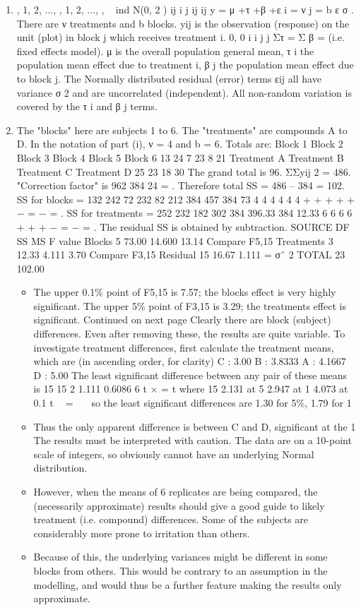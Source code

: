 \documentclass[a4paper,12pt]{article}
\begin{document}
\begin{enumerate}
\item , 1, 2, ..., , 1, 2, ..., , { } ~ ind N(0, 2 ) ij i j ij ij y = μ +τ +β +ε i = ν j = b ε σ .
There are ν treatments and b blocks. yij is the observation (response) on the unit (plot)
in block j which receives treatment i. 0, 0 i i j j Στ = Σ β = (i.e. fixed effects model).
μ is the overall population general mean, τ
i the population mean effect due to
treatment i, β
j the population mean effect due to block j. The Normally distributed
residual (error) terms εij all have variance σ 2 and are uncorrelated (independent). All
non-random variation is covered by the τ
i and β
j terms.
\item The "blocks" here are subjects 1 to 6. The "treatments" are compounds A to
D. In the notation of part (i), ν = 4 and b = 6.
Totals are: Block 1 Block 2 Block 3 Block 4 Block 5 Block 6
13 24 7 23 8 21
Treatment A Treatment B Treatment C Treatment D
25 23 18 30
The grand total is 96. ΣΣyij
2 = 486.
"Correction factor" is
962 384
24
= .
Therefore total SS = 486 – 384 = 102.
SS for blocks =
132 242 72 232 82 212 384 457 384 73
4 4 4 4 4 4
+ + + + + − = − = .
SS for treatments =
252 232 182 302 384 396.33 384 12.33
6 6 6 6
+ + + − = − = .
The residual SS is obtained by subtraction.
SOURCE DF SS MS F value
Blocks 5 73.00 14.600 13.14 Compare F5,15
Treatments 3 12.33 4.111 3.70 Compare F3,15
Residual 15 16.67 1.111 = σˆ 2
TOTAL 23 102.00

\begin{itemize}
    \item 
The upper 0.1\% point of F5,15 is 7.57; the blocks effect is very highly significant.
The upper 5\% point of F3,15 is 3.29; the treatments effect is significant.
Continued on next page
Clearly there are block (subject) differences. Even after removing these, the results
are quite variable.
To investigate treatment differences, first calculate the treatment means, which are (in
ascending order, for clarity)
C : 3.00 B : 3.8333 A : 4.1667 D : 5.00
The least significant difference between any pair of these means is
15 15
2 1.111 0.6086
6
t × = t where 15
2.131 at 5%
2.947 at 1%
4.073 at 0.1%
t

=


so the least significant differences are 1.30 for 5\%, 1.79 for 1%
\item Thus the only apparent difference is between C and D, significant at the 1%
The results must be interpreted with caution.
The data are on a 10-point scale of integers, so obviously cannot have an underlying
Normal distribution. 
\item However, when the means of 6 replicates are being compared,
the (necessarily approximate) results should give a good guide to likely treatment (i.e.
compound) differences.
Some of the subjects are considerably more prone to irritation than others. 
\item Because of
this, the underlying variances might be different in some blocks from others. This
would be contrary to an assumption in the modelling, and would thus be a further
feature making the results only approximate.

\end{itemize}
\end{enumerate}
\end{document}
